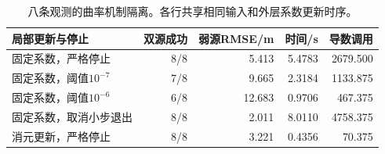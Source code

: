 \begin{table}[htbp]\centering\small
\caption{八条观测的曲率机制隔离。各行共享相同输入和外层系数更新时序。}\label{tab:mechanism}
\begin{tabular}{@{}lrrrr@{}}\toprule
局部更新与停止 & 双源成功 & 弱源RMSE/m & 时间/s & 导数调用\\\midrule
固定系数，严格停止 & 8/8 & 5.413 & 5.4783 & 2679.500\\
固定系数，阈值$10^{-7}$ & 7/8 & 9.665 & 2.3184 & 1133.875\\
固定系数，阈值$10^{-6}$ & 6/8 & 12.683 & 0.9706 & 467.375\\
固定系数，取消小步退出 & 8/8 & 2.011 & 8.0110 & 4758.375\\
消元更新，严格停止 & 8/8 & 3.221 & 0.4356 & 70.375\\
\bottomrule\end{tabular}\end{table}
